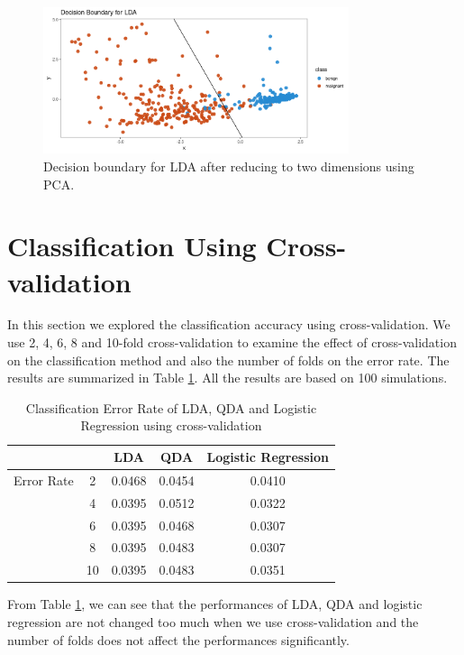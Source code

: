 \documentclass[12pt]{article}
\begin{document}
\begin{figure}[tb]
	\centering
	\includegraphics[width=0.8\textwidth]{../images/lda.png}
	\caption{Decision boundary for LDA after reducing to two dimensions using PCA.}
	\label{fig:lda}
\end{figure}

\section{Classification Using Cross-validation}
In this section we explored the classification accuracy using cross-validation. We use 2, 4, 6, 8 and 10-fold cross-validation to examine the effect of cross-validation on the classification method and also the number of folds on the error rate. The results are summarized in Table \ref{tab4}. All the results are based on 100 simulations. 
\begin{table}[htbp]
	\begin{center}
		\caption{\label{tab4} Classification Error Rate of LDA, QDA and Logistic Regression using cross-validation}
		\begin{tabular}{c|c|ccc}
			\hline
			&&LDA &QDA &Logistic Regression \\
            \hline
            Error Rate& 2&0.0468 &0.0454 &0.0410  \\ 
           \hline
	       &4 &0.0395 &0.0512 &0.0322  \\ 
		     \hline
		  &6 &0.0395 &0.0468 &0.0307  \\
		    \hline
		&8 &0.0395 &0.0483 &0.0307  \\
			\hline
		&10 &0.0395 &0.0483 &0.0351  \\
			\hline
		\end{tabular}
	\end{center}
\end{table}

From Table \ref{tab4}, we can see that the performances of LDA, QDA and logistic regression are not changed too much when we use cross-validation and the number of folds does not affect the performances significantly.
\end{document}
